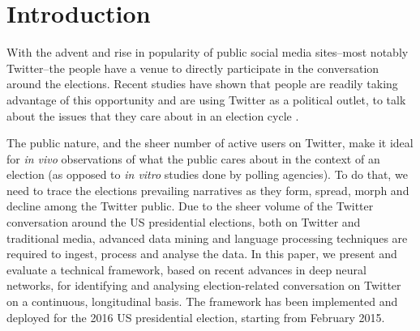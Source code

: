 \documentclass[letterpaper]{article}
\begin{document}
\linespread{.97}
\setlength{\belowcaptionskip}{-6pt}



\section{Introduction}
With the advent and rise in popularity of public social media sites--most notably Twitter--the people have a venue to directly participate in the conversation around the elections. Recent studies have shown that people are readily taking advantage of this opportunity and are using Twitter as a political outlet, to talk about the issues that they care about in an election cycle \cite{twitter_elec}.

The public nature, and the sheer number of active users on Twitter, make it ideal for \emph{in vivo} observations of what the public cares about in the context of an election (as opposed to \emph{in vitro} studies done by polling agencies). To do that, we need to trace the elections prevailing narratives as they form, spread, morph and decline among the Twitter public. Due to the sheer volume of the Twitter conversation around the US presidential elections, both on Twitter and traditional media, advanced data mining and language processing techniques are required to ingest, process and analyse the data. In this paper, we present and evaluate a technical framework, based on recent advances in deep neural networks, for identifying and analysing election-related conversation on Twitter on a continuous, longitudinal basis. The framework has been implemented and deployed for the 2016 US presidential election, starting from February 2015.
\end{document}
